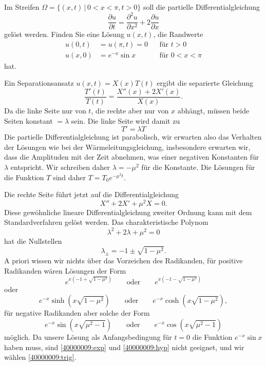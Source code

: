 Im Streifen $\Omega=\{ (x,t)\, |\, 0<x<\pi, t > 0\}$ soll die partielle
Differentialgleichung
\[
\frac{\partial u}{\partial t}
=
\frac{\partial^2 u}{\partial x^2}+2\frac{\partial u}{\partial x}
\]
gelöst werden. Finden Sie eine Lösung $u(x,t)$, die Randwerte
\begin{align*}
u(0,t)&=u(\pi,t)=0&&\text{für $t>0$}\\
u(x,0)&=e^{-x}\sin x&&\text{für $0<x<\pi$}
\end{align*}
hat.

\begin{loesung}
Ein Separationsansatz $u(x,t)=X(x)T(t)$ ergibt die separierte Gleichung
\[
\frac{T'(t)}{T(t)}
=
\frac{X''(x)+2X'(x)}{X(x)}.
\]
Da die linke Seite nur von $t$, die rechte aber nur von $x$ abhängt,
müssen beide Seiten konstant $=\lambda$ sein. Die linke Seite wird
damit zu
\[
T' = \lambda T
\]
Die partielle Differentialgleichung ist parabolisch, wir erwarten also
das Verhalten der Lösungen wie bei der Wärmeleitungsgleichung, insbesondere
erwarten wir, dass die Amplituden mit der Zeit abnehmen, was einer
negativen Konstanten für $\lambda$ entspricht. Wir schreiben daher
$\lambda=-\mu^2$ für die Konstante.
Die Lösungen für die Funktion $T$ sind daher $T=T_0e^{-\mu^2t}$.

Die rechte Seite führt jetzt auf die Differentialgleichung
\[
X''+2X'+\mu^2X=0.
\]
Diese gewöhnliche lineare Differentialgleichung zweiter Ordnung
kann mit dem Standardverfahren gelöst werden. Das charakteristische
Polynom 
\[
\lambda^2+2\lambda +\mu^2=0
\]
hat die Nullstellen
\[
\lambda_{\pm}=-1\pm\sqrt{1-\mu^2}.
\]
A priori wissen wir nichts über das Vorzeichen des Radikanden,
für positive Radikanden wären Lösungen der Form
\begin{equation}
e^{x(-1+ \sqrt{1-\mu^2})}
\qquad
\text{oder}
\qquad
e^{x(-1-\sqrt{1-\mu^2})}
\label{40000009:exp}
\end{equation}
oder
\begin{equation}
e^{-x}\sinh(x\sqrt{1-\mu^2})
\qquad
\text{oder}
\qquad
e^{-x}\cosh(x\sqrt{1-\mu^2}),
\label{40000009:hyp}
\end{equation}
für negative Radikanden aber solche der Form
\begin{equation}
e^{-x}\sin(x\sqrt{\mu^2-1})
\qquad
\text{oder}
\qquad
e^{-x}\cos(x\sqrt{\mu^2-1})
\label{40000009:trig}
\end{equation}
möglich. Da unsere Lösung als Anfangsbedingung für $t=0$ die
Funktion $e^{-x}\sin x$ haben muss, sind \eqref{40000009:exp}
und \eqref{40000009:hyp} nicht geeignet, und wir
wählen \eqref{40000009:trig}.


\end{loesung}
